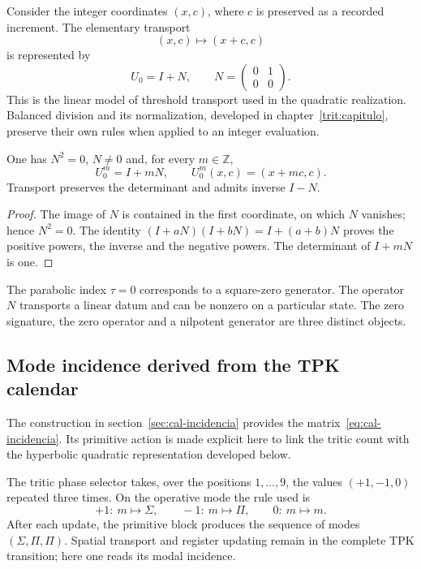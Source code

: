 Consider the integer coordinates \((x,c)\), where \(c\) is preserved
as a recorded increment. The elementary transport
\[
 (x,c)\longmapsto(x+c,c)
\]
is represented by
\[
 U_0=I+N,
 \qquad N=\begin{pmatrix}0&1\\0&0\end{pmatrix}.
\]
This is the linear model of threshold transport used in the
quadratic realization. Balanced division and its normalization,
developed in chapter~\ref{trit:capitulo}, preserve their own
rules when applied to an integer evaluation.

\begin{proposicion}
\label{eul:prop:parabolico}
One has \(N^2=0\), \(N\ne0\) and, for every \(m\in\mathbb Z\),
\[
 U_0^m=I+mN,
 \qquad U_0^m(x,c)=(x+mc,c).
\]
Transport preserves the determinant and admits inverse \(I-N\).
\end{proposicion}
\begin{proof}
The image of \(N\) is contained in the first coordinate, on which
\(N\) vanishes; hence \(N^2=0\). The identity
\((I+aN)(I+bN)=I+(a+b)N\) proves the positive powers, the inverse and
the negative powers. The determinant of \(I+mN\) is one.
\end{proof}

The parabolic index \(\tau=0\) corresponds to a square-zero
generator. The operator \(N\) transports a linear datum and can be nonzero
on a particular state. The zero signature, the zero operator and a
nilpotent generator are three distinct objects.

\subsection{Mode incidence derived from the TPK calendar}
\label{eul:incidencia-modos}

The construction in section~\ref{sec:cal-incidencia} provides
the matrix~\eqref{eq:cal-incidencia}. Its primitive action is made explicit here
to link the tritic count with the hyperbolic quadratic representation
developed below.

The tritic phase selector takes, over the positions \(1,\ldots,9\),
the values \((+1,-1,0)\) repeated three times. On the operative mode
the rule used is
\[
 +1:\ m\mapsto\Sigma,\qquad
 -1:\ m\mapsto\Pi,\qquad
 0:\ m\mapsto m.
\]
After each update, the primitive block produces the sequence
of modes \((\Sigma,\Pi,\Pi)\). Spatial transport and register
updating remain in the complete TPK transition; here one reads
its modal incidence.


